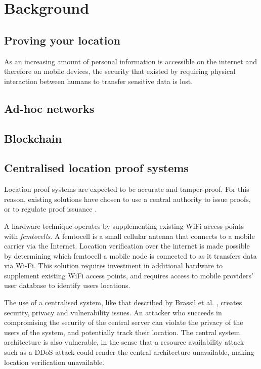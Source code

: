 \section{Background}
\subsection{Proving your location}
As an increasing amount of personal information is accessible on the internet and therefore on mobile devices, the security that existed by requiring physical interaction between humans to transfer sensitive data is lost.

\subsection{Ad-hoc networks}

\subsection{Blockchain}

\subsection{Centralised location proof systems}
Location proof systems are expected to be accurate and tamper-proof. For this reason, existing solutions have chosen to use a central authority to issue proofs, or to regulate proof issuance \cite{brassil, luo, khan}.

A hardware technique \cite{brassil} operates by supplementing existing WiFi access points with \textit{femtocells}. A femtocell is a small cellular antenna that connects to a mobile carrier via the Internet. Location verification over the internet is made possible by determining which femtocell a mobile node is connected to as it transfers data via Wi-Fi. This solution requires investment in additional hardware to supplement existing WiFi access points, and requires access to mobile providers' user database to identify users locations.

The use of a centralised system, like that described by Brassil et al. \cite{brassil}, creates security, privacy and vulnerability issues. An attacker who succeeds in compromising the security of the central server can violate the privacy of the users of the system, and potentially track their location. The central system architecture is also vulnerable, in the sense that a resource availability attack such as a DDoS attack could render the central architecture unavailable, making location verification unavailable.


